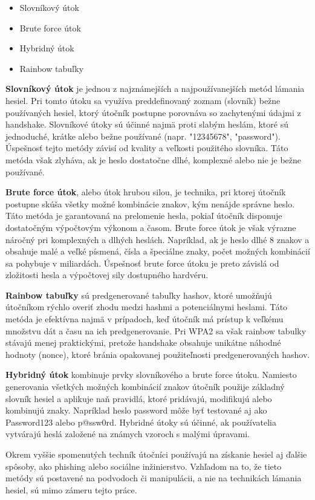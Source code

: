 \documentclass[12pt, twoside]{book}
\begin{document}
\begin{itemize}
\item Slovníkový útok
\item Brute force útok
\item Hybridný útok
\item Rainbow tabuľky
\end{itemize}

\textbf{Slovníkový útok} je jednou z najznámejších a najpoužívanejších metód lámania hesiel. Pri tomto útoku sa využíva preddefinovaný zoznam (slovník) bežne používaných hesiel, ktorý útočník postupne porovnáva so zachytenými údajmi z handshake. Slovníkové útoky sú účinné najmä proti slabým heslám, ktoré sú jednoduché, krátke alebo bežne používané (napr. "12345678", "password"). Úspešnosť tejto metódy závisí od kvality a veľkosti použitého slovníka. Táto metóda však zlyháva, ak je heslo dostatočne dlhé, komplexné alebo nie je bežne používané.

\textbf{Brute force útok}, alebo útok hrubou silou, je technika, pri ktorej útočník postupne skúša všetky možné kombinácie znakov, kým nenájde správne heslo. Táto metóda je garantovaná na prelomenie hesla, pokiaľ útočník disponuje dostatočným výpočtovým výkonom a časom. Brute force útok je však výrazne náročný pri komplexných a dlhých heslách. Napríklad, ak je heslo dlhé 8 znakov a obsahuje malé a veľké písmená, čísla a špeciálne znaky, počet možných kombinácií sa pohybuje v miliardách. Úspešnosť brute force útoku je preto závislá od zložitosti hesla a výpočtovej sily dostupného hardvéru.

\textbf{Rainbow tabuľky} sú predgenerované tabuľky hashov, ktoré umožňujú útočníkom rýchlo overiť zhodu medzi hashmi a potenciálnymi heslami. Táto metóda je efektívna najmä v prípadoch, keď útočník má prístup k veľkému množstvu dát a času na ich predgenerovanie. Pri WPA2 sa však rainbow tabulky stávajú menej praktickými, pretože handshake obsahuje unikátne náhodné hodnoty (nonce), ktoré bránia opakovanej použiteľnosti predgenerovaných hashov. 


\textbf{Hybridný útok} kombinuje prvky slovníkového a brute force útoku. Namiesto generovania všetkých možných kombinácií znakov útočník použije základný slovník hesiel a aplikuje naň pravidlá, ktoré pridávajú, modifikujú alebo kombinujú znaky. Napríklad heslo password môže byť testované aj ako Password123 alebo p@ssw0rd. Hybridné útoky sú účinné, ak používatelia vytvárajú heslá založené na známych vzoroch s malými úpravami.

Okrem vyššie spomenutých techník útočníci používajú na získanie hesiel aj ďalšie spôsoby, ako phishing alebo sociálne inžinierstvo. Vzhľadom na to, že tieto metódy sú postavené na podvodoch či manipulácii, a nie na technikách lámania hesiel, sú mimo zámeru tejto práce.
\end{document}
